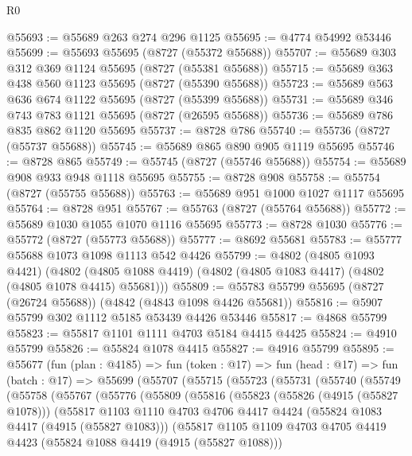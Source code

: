 \begin{lexlean}{R0}
\begin{coremodule}
@55693 := @55689 @263 @274 @296 @1125
@55695 := @4774 @54992 @53446
@55699 := @55693 @55695 (@8727 (@55372 @55688))
@55707 := @55689 @303 @312 @369 @1124 @55695 (@8727 (@55381 @55688))
@55715 := @55689 @363 @438 @560 @1123 @55695 (@8727 (@55390 @55688))
@55723 := @55689 @563 @636 @674 @1122 @55695 (@8727 (@55399 @55688))
@55731 := @55689 @346 @743 @783 @1121 @55695 (@8727 (@26595 @55688))
@55736 := @55689 @786 @835 @862 @1120 @55695
@55737 := @8728 @786
@55740 := @55736 (@8727 (@55737 @55688))
@55745 := @55689 @865 @890 @905 @1119 @55695
@55746 := @8728 @865
@55749 := @55745 (@8727 (@55746 @55688))
@55754 := @55689 @908 @933 @948 @1118 @55695
@55755 := @8728 @908
@55758 := @55754 (@8727 (@55755 @55688))
@55763 := @55689 @951 @1000 @1027 @1117 @55695
@55764 := @8728 @951
@55767 := @55763 (@8727 (@55764 @55688))
@55772 := @55689 @1030 @1055 @1070 @1116 @55695
@55773 := @8728 @1030
@55776 := @55772 (@8727 (@55773 @55688))
@55777 := @8692 @55681
@55783 := @55777 @55688 @1073 @1098 @1113 @542 @4426
@55799 := @4802
    (@4805 @1093 @4421)
    (@4802 (@4805 @1088 @4419) (@4802 (@4805 @1083 @4417) (@4802 (@4805 @1078 @4415) @55681)))
@55809 := @55783 @55799 @55695 (@8727 (@26724 @55688)) (@4842 (@4843 @1098 @4426 @55681))
@55816 := @5907 @55799 @302 @1112 @5185 @53439 @4426 @53446
@55817 := @4868 @55799
@55823 := @55817 @1101 @1111 @4703 @5184 @4415 @4425
@55824 := @4910 @55799
@55826 := @55824 @1078 @4415
@55827 := @4916 @55799
@55895 := @55677
    (fun (plan : @4185) =>
    fun (token : @17) =>
    fun (head : @17) =>
    fun (batch : @17) =>
    @55699
      (@55707
        (@55715
          (@55723
            (@55731
              (@55740
                (@55749
                  (@55758
                    (@55767
                      (@55776
                        (@55809
                          (@55816
                            (@55823
                              (@55826 (@4915 (@55827 @1078)))
                              (@55817
                                @1103
                                @1110
                                @4703
                                @4706
                                @4417
                                @4424
                                (@55824 @1083 @4417 (@4915 (@55827 @1083)))
                                (@55817
                                  @1105
                                  @1109
                                  @4703
                                  @4705
                                  @4419
                                  @4423
                                  (@55824 @1088 @4419 (@4915 (@55827 @1088)))

\end{coremodule}
\end{lexlean}
